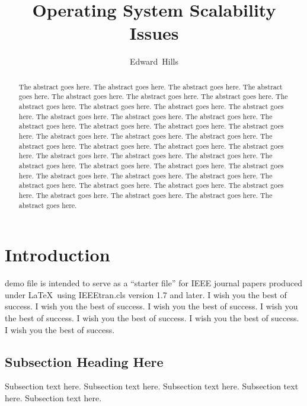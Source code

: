 \documentclass[journal]{IEEEtran}
\begin{document}
%
\title{Operating System Scalability Issues}

\author{Edward~Hills}

\maketitle

\begin{abstract}
The abstract goes here.
The abstract goes here.
The abstract goes here.
The abstract goes here.
The abstract goes here.
The abstract goes here.
The abstract goes here.
The abstract goes here.
The abstract goes here.
The abstract goes here.
The abstract goes here.
The abstract goes here.
The abstract goes here.
The abstract goes here.
The abstract goes here.
The abstract goes here.
The abstract goes here.
The abstract goes here.
The abstract goes here.
The abstract goes here.
The abstract goes here.
The abstract goes here.
The abstract goes here.
The abstract goes here.
The abstract goes here.
The abstract goes here.
The abstract goes here.
The abstract goes here.
The abstract goes here.
The abstract goes here.
The abstract goes here.
The abstract goes here.
The abstract goes here.
The abstract goes here.
The abstract goes here.
The abstract goes here.
The abstract goes here.
The abstract goes here.
The abstract goes here.
The abstract goes here.
The abstract goes here.
The abstract goes here.
The abstract goes here.
\end{abstract}

\section{Introduction}
 demo file is intended to serve as a ``starter file''
for IEEE journal papers produced under \LaTeX\ using
IEEEtran.cls version 1.7 and later.
I wish you the best of success.
I wish you the best of success.
I wish you the best of success.
I wish you the best of success.
I wish you the best of success.
I wish you the best of success.
I wish you the best of success.

\subsection{Subsection Heading Here}
Subsection text here.
Subsection text here.
Subsection text here.
Subsection text here.
Subsection text here.
\end{document}
